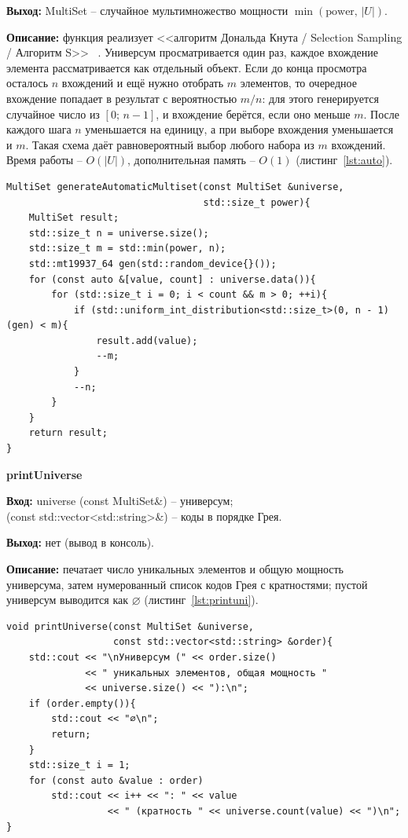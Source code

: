 \documentclass[14pt,a4paper]{extreport}
\newcommand{\card}[1]{\left|#1\right|}
\newcommand{\code}[1]{{\ttfamily #1}}
\begin{document}
\textbf{Выход:} \code{MultiSet} -- случайное мультимножество мощности $\min(\text{power},\,\card{U})$.

\textbf{Описание:} функция реализует <<алгоритм Дональда Кнута / Selection Sampling / Алгоритм S>> ~\cite{knuth2}.
Универсум просматривается один раз, каждое вхождение элемента рассматривается как отдельный объект. Если до конца просмотра осталось $n$ вхождений и ещё нужно отобрать $m$ элементов, то очередное вхождение попадает в результат с вероятностью $m/n$: для этого генерируется случайное число из $[0;\,n-1]$, и вхождение берётся, если оно меньше $m$. После каждого шага $n$ уменьшается на единицу, а при выборе вхождения уменьшается и $m$. Такая схема даёт равновероятный выбор любого набора из $m$ вхождений. Время работы -- $O(\card{U})$, дополнительная память -- $O(1)$ (листинг~\ref{lst:auto}).
\begin{listing}[H]
\caption{Функция \code{generateAutomaticMultiset} (input.cpp)}\label{lst:auto}
\begin{lstlisting}
MultiSet generateAutomaticMultiset(const MultiSet &universe,
                                   std::size_t power){
    MultiSet result;
    std::size_t n = universe.size();
    std::size_t m = std::min(power, n);
    std::mt19937_64 gen(std::random_device{}());
    for (const auto &[value, count] : universe.data()){
        for (std::size_t i = 0; i < count && m > 0; ++i){
            if (std::uniform_int_distribution<std::size_t>(0, n - 1)(gen) < m){
                result.add(value);
                --m;
            }
            --n;
        }
    }
    return result;
}
\end{lstlisting}
\end{listing}

\textbf{printUniverse}

\textbf{Вход:} \code{universe} (\code{const MultiSet\&}) -- универсум; \\
\noindent \code{order} (\code{const std::vector<std::string>\&}) -- коды в порядке Грея.

\textbf{Выход:} нет (вывод в консоль).

\textbf{Описание:} печатает число уникальных элементов и общую мощность универсума, затем нумерованный список кодов Грея с кратностями; пустой универсум выводится как $\varnothing$ (листинг~\ref{lst:printuni}).

\begin{listing}[H]
\caption{Функция \code{printUniverse} (input.cpp)}\label{lst:printuni}
\begin{lstlisting}
void printUniverse(const MultiSet &universe,
                   const std::vector<std::string> &order){
    std::cout << "\nУниверсум (" << order.size()
              << " уникальных элементов, общая мощность "
              << universe.size() << "):\n";
    if (order.empty()){
        std::cout << "∅\n";
        return;
    }
    std::size_t i = 1;
    for (const auto &value : order)
        std::cout << i++ << ": " << value
                  << " (кратность " << universe.count(value) << ")\n";
}
\end{lstlisting}
\end{listing}
\end{document}
